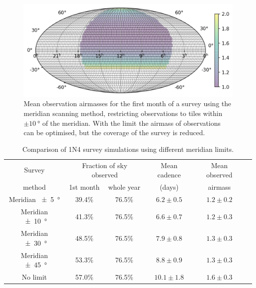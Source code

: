 \begin{colsection}
\begin{colsection}
\begin{figure}[p]
    \begin{center}
        \includegraphics[width=0.7\linewidth]{images/survey_sims/30_1N4_meridian_airmass.png}
    \end{center}
    \caption[Mean observation airmasses using the meridian scanning method]{
        Mean observation airmasses for the first month of a survey using the meridian scanning method, restricting observations to tiles within $\pm\SI{10}{\degree}$ of the meridian. With the limit the airmass of observations can be optimised, but the coverage of the survey is reduced.
    }\label{fig:survey_sim_airmass_meridian}
\end{figure}

\clearpage

\begin{table}[t]
    \begin{center}
        \begin{tabular}{c|cc|c|c|c} %
            Survey &
            \multicolumn{2}{c|}{Fraction of sky observed} &
            Mean cadence &
            Mean observed
            \\
            method &
            1st month &
            whole year &
            (days) &
            airmass
            \\
            \midrule
            Meridian  \SI{\pm5}{\degree} & 39.4\% & 76.5\% &  $6.2\pm0.5$ & $1.2\pm0.2$ \\
            Meridian \SI{\pm10}{\degree} & 41.3\% & 76.5\% &  $6.6\pm0.7$ & $1.2\pm0.3$ \\
            Meridian \SI{\pm30}{\degree} & 48.5\% & 76.5\% &  $7.9\pm0.8$ & $1.3\pm0.3$ \\
            Meridian \SI{\pm45}{\degree} & 53.3\% & 76.5\% &  $8.8\pm0.9$ & $1.3\pm0.3$ \\
            No limit                     & 57.0\% & 76.5\% & $10.1\pm1.8$ & $1.6\pm0.3$ \\
        \end{tabular}
    \end{center}
    \caption[Comparison of survey simulations using a meridian limit]{
        Comparison of 1N4 survey simulations using different meridian limits.
    }\label{tab:survey_sim_meridian}
\end{table}


\end{colsection}
\end{colsection}
